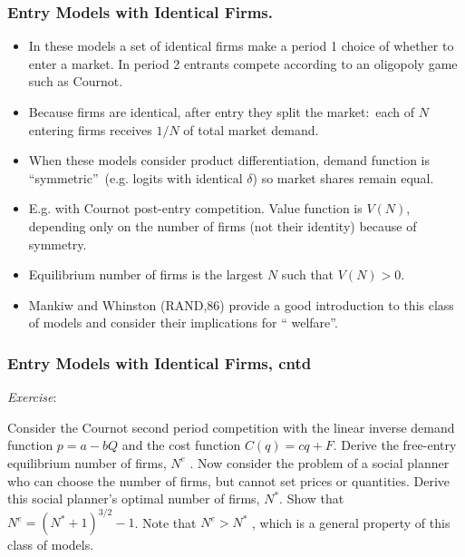 \documentclass[notes=show]{beamer}
\begin{document}
\begin{frame}%

\frametitle{Entry Models with Identical Firms.}

\begin{itemize}
\item In these models a set of identical firms make a period 1 choice of
whether to enter a market. In period 2 entrants compete according to an
oligopoly game such as Cournot.

\item Because firms are identical, after entry they split the market:\ each
of $N$ entering firms receives $1/N$ of total market demand.

\item When these models consider product differentiation, demand function is
\textquotedblleft symmetric\textquotedblright\ (e.g. logits with identical $%
\delta $) so market shares remain equal.

\item E.g. with Cournot post-entry competition. Value function is $V(N)$,
depending only on the number of firms (not their identity) because of
symmetry.

\item Equilibrium number of firms is the largest $N$ such that $V(N)>0$.

\item Mankiw and Whinston (RAND,86) provide a good introduction to this
class of models and consider their implications for \textquotedblleft
welfare\textquotedblright .
\end{itemize}

\end{frame}%

\begin{frame}%

\frametitle{Entry Models with Identical Firms, cntd}

\textit{Exercise}:

Consider the Cournot second period competition with the linear inverse
demand function $p=a-bQ$ and the cost function $C(q)=cq+F$. Derive the
free-entry equilibrium number of firms, $N^{e}$ . Now consider the problem
of a social planner who can choose the number of firms, but cannot set
prices or quantities. Derive this social planner's optimal number of firms, $%
N^{\ast }$. Show that $N^{e}=(N^{\ast }+1)^{3/2}-1$. Note that $%
N^{e}>N^{\ast }$ , which is a general property of this class of models.

\end{frame}%
\end{document}
